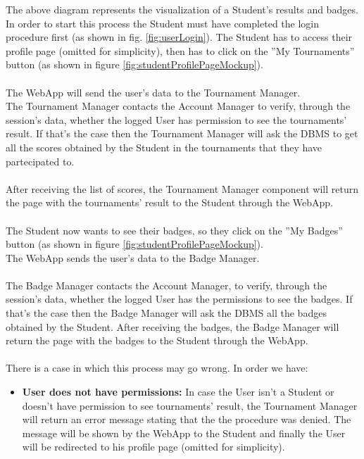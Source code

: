\documentclass{article}
\begin{document}
{        The above diagram represents the visualization of a Student's results and badges. \\
        In order to start this process the Student must have 
        completed the login procedure first (as shown in fig. \ref{fig:userLogin}).
        The Student has to access their profile page (omitted for simplicity), 
        then has to click on the ”My Tournaments” button (as shown in figure \ref{fig:studentProfilePageMockup}).
        \\ \\
        The WebApp will send the user's data to the Tournament Manager.\\
        The Tournament Manager contacts the Account Manager to verify, 
        through the session's data, whether the logged User has 
        permission to see the tournaments' result. If that's the case then 
        the Tournament Manager will ask the DBMS to get all the scores 
        obtained by the Student in the tournaments that they have partecipated to.
        \\ \\
        After receiving the list of scores, the Tournament Manager component will 
        return the page with the tournaments' result to the Student through 
        the WebApp.
        \\ \\
        The Student now wants to see their badges, so they
        click on the ”My Badges” button (as shown in figure \ref{fig:studentProfilePageMockup}).\\
        The WebApp sends the user's data to the Badge Manager.
        \\ \\
        The Badge Manager contacts the Account Manager, to verify, 
        through the session's data, whether the logged User has the 
        permissions to see the badges. If that's the case then 
        the Badge Manager will ask the DBMS all the badges obtained by
        the Student. After receiving the badges, the Badge Manager will 
        return the page with the badges to the Student through the WebApp. 
        \\ \\
        There is a case in which this process may go wrong. In order we have:
        \begin{itemize}
            \item \textbf{User does not have permissions:} In case the User isn't a Student or
            doesn't have permission to see tournaments' result, the Tournament Manager 
            will return an error message stating that the the procedure was denied. 
            The message will be shown by the WebApp to the Student and finally the User will be
            redirected to his profile page (omitted for simplicity).
        \end{itemize}

}
\end{document}
